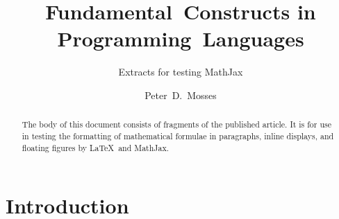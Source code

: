\documentclass[runningheads,fleqn]{llncs}
\begin{document}
\title{Fundamental~Constructs in Programming~Languages}

\subtitle{Extracts for testing MathJax}


\author{Peter~D.~Mosses}


\maketitle

\begin{abstract}

The body of this document consists of fragments of the published article.
It is for use in testing the formatting of mathematical formulae
in paragraphs, inline displays, and floating figures by \LaTeX\ and MathJax.

\end{abstract}


\section{Introduction}
\label{sec:introduction}
\end{document}
